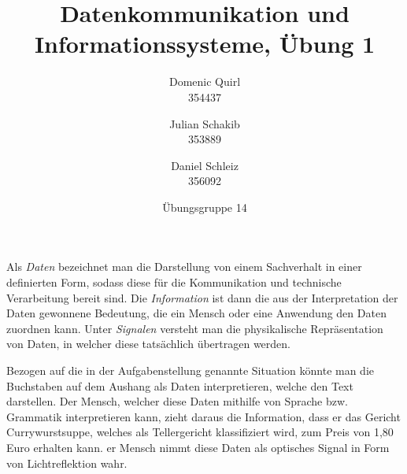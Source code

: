 \documentclass{../exercisesheet}
\title{Datenkommunikation und Informationssysteme, Übung 1}
\author{
    Domenic Quirl \\ 354437
    \and
    Julian Schakib \\ 353889
    \and 
    Daniel Schleiz \\ 356092
}
\date{Übungsgruppe 14}
\begin{document}
\maketitle
\pointtable

\begin{exercise}{3}
	Als \textit{Daten} bezeichnet man die Darstellung von einem Sachverhalt in einer definierten Form, sodass diese für die Kommunikation und technische Verarbeitung bereit sind.
	Die \textit{Information} ist dann die aus der Interpretation der Daten gewonnene Bedeutung, die ein Mensch oder eine Anwendung den Daten zuordnen kann. Unter \textit{Signalen}
	versteht man die physikalische Repräsentation von Daten, in welcher diese tatsächlich übertragen werden. \par
	Bezogen auf die in der Aufgabenstellung genannte Situation könnte man die Buchstaben auf dem Aushang als Daten interpretieren, welche den Text darstellen. Der Mensch,
	welcher diese Daten mithilfe von Sprache bzw. Grammatik interpretieren kann, zieht daraus die Information, dass er das Gericht Currywurstsuppe, welches als Tellergericht
	klassifiziert wird, zum Preis von 1,80 Euro erhalten kann. er Mensch nimmt diese Daten als optisches Signal in Form von Lichtreflektion wahr.\\
\end{exercise}
\end{document}

